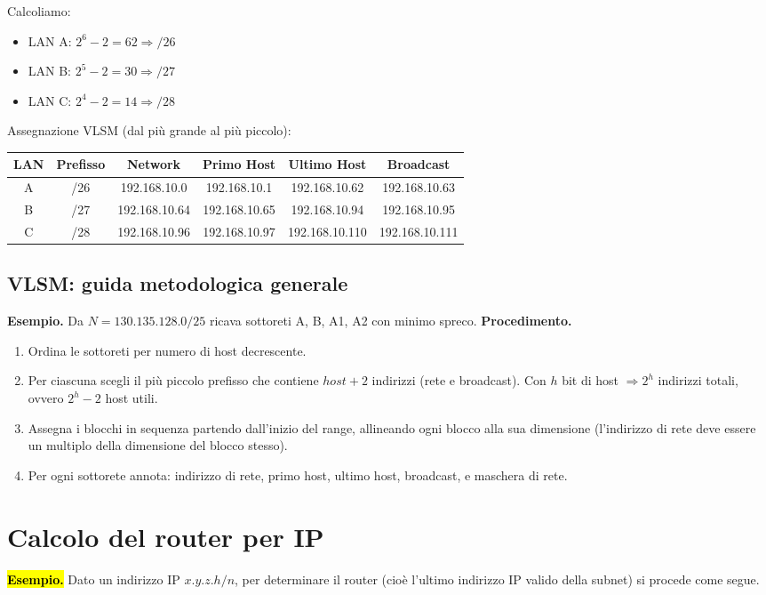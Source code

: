 \documentclass[11pt,a4paper]{report}
\begin{document}
Calcoliamo:
\begin{itemize}
  \item LAN A: $2^6 - 2 = 62 \Rightarrow /26$
  \item LAN B: $2^5 - 2 = 30 \Rightarrow /27$
  \item LAN C: $2^4 - 2 = 14 \Rightarrow /28$
\end{itemize}

Assegnazione VLSM (dal più grande al più piccolo):

\begin{center}
\begin{tabular}{|c|c|c|c|c|c|}
\hline
LAN & Prefisso & Network & Primo Host & Ultimo Host & Broadcast \\
\hline
A & /26 & 192.168.10.0 & 192.168.10.1 & 192.168.10.62 & 192.168.10.63 \\
\hline
B & /27 & 192.168.10.64 & 192.168.10.65 & 192.168.10.94 & 192.168.10.95 \\
\hline
C & /28 & 192.168.10.96 & 192.168.10.97 & 192.168.10.110 & 192.168.10.111 \\
\hline
\end{tabular}
\end{center}

\subsection{VLSM: guida metodologica generale}
\textbf{Esempio.} Da $N=130.135.128.0/25$ ricava sottoreti A, B, A1, A2 con minimo spreco.
\textbf{Procedimento.}
\begin{enumerate}[noitemsep]
\item Ordina le sottoreti per numero di host decrescente.
\item Per ciascuna scegli il più piccolo prefisso che contiene $host+2$ indirizzi (rete e broadcast). Con $h$ bit di host $\Rightarrow 2^h$ indirizzi totali, ovvero $2^h-2$ host utili.
\item Assegna i blocchi in sequenza partendo dall'inizio del range, allineando ogni blocco alla sua dimensione (l'indirizzo di rete deve essere un multiplo della dimensione del blocco stesso).
\item Per ogni sottorete annota: indirizzo di rete, primo host, ultimo host, broadcast, e maschera di rete.
\end{enumerate}

\section{Calcolo del router per IP}
\label{teoria:router}
\hl{\textbf{Esempio.}} Dato un indirizzo IP $x.y.z.h/n$, per determinare il router (cioè l'ultimo indirizzo IP valido della subnet) si procede come segue.
\end{document}

